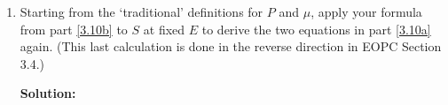 \documentclass[10pt]{article}
\newenvironment{Solution}
    {\textbf{Solution:}
    
    \vspace{5mm}
    \begin{tcolorbox}
    }
    {
    \end{tcolorbox}
    \vspace{5mm}
    }
\begin{document}
\begin{enumerate}
\begin{enumerate}
    \begin{Solution}
    If $f = f(x,y)$ then,
    \begin{align}
        d f&=\left.\frac{\partial f}{\partial x}\right|_{y} d x+\left.\frac{\partial f}{\partial y}\right|_{x} d y\\
        d x&=\left.\frac{\partial x}{\partial f}\right|_{y} d f+\left.\frac{\partial x}{\partial y}\right|_{f} d y\\
        d y&=\left.\frac{\partial y}{\partial f}\right|_{x} d f+\left.\frac{\partial y}{\partial x}\right|_{f} d x
    \end{align}
    We next can substitute one of expressions into one of the others and compare coefficients. This gets us,
    \begin{equation}
        d x=\left.\frac{\partial x}{\partial f}\right|_{y} d f+\left.\frac{\partial x}{\partial y}\right|_{f}\left[\left.\frac{\partial y}{\partial f}\right|_{x} d f+\left.\frac{\partial y}{\partial x}\right|_{f} d x\right]
    \end{equation}
    For $d f$,
    \begin{equation}
        0 = \left.\frac{\partial x}{\partial f}\right|_{y} + \left.\frac{\partial x}{\partial y}\right|_{f}\left.\frac{\partial y}{\partial f}\right|_{x}
    \end{equation}
    and for $d x$,
    \begin{equation}
        1 = \left.\frac{\partial y}{\partial x}\right|_{f} \left.\frac{\partial x}{\partial y}\right|_{f}
    \end{equation}
    We can combine these two expressions to get,
    \begin{equation}
    \boxed{
        \left.\frac{\partial x}{\partial y}\right|_f \left.\frac{\partial y}{\partial f}\right|_x \left.\frac{\partial f}{\partial x}\right|_y = -1
        }
    \end{equation}
    \end{Solution}
    \newpage 
    \item Starting from the ‘traditional’ definitions for $P$ and $\mu$, apply your formula from part \ref{3.10b} to $S$ at fixed $E$ to derive the two equations in part \ref{3.10a} again. (This last calculation is done in the reverse direction in EOPC Section 3.4.)
    
    \begin{Solution}
    

\end{Solution}
\end{enumerate}
\end{enumerate}
\end{document}
